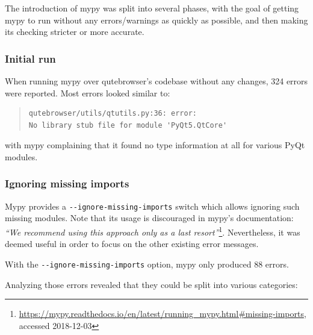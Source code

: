\documentclass[a4paper,parskip=full]{scrreprt}
\begin{document}
The introduction of mypy was split into several phases, with the goal of getting
mypy to run without any errors/warnings as quickly as possible, and then making
its checking stricter or more accurate.

\subsubsection{Initial run}
When running mypy over qutebrowser's codebase without any changes, 324 errors
were reported. Most errors looked similar to:

\begin{quote}
\begin{verbatim}
qutebrowser/utils/qtutils.py:36: error:
No library stub file for module 'PyQt5.QtCore'
\end{verbatim}
\end{quote}

with mypy complaining that it found no type information at all for various PyQt
modules.

\subsubsection{Ignoring missing imports}

Mypy provides a \verb|--ignore-missing-imports| switch which allows ignoring
such missing modules. Note that its usage is discouraged in mypy's documentation:
\emph{``We recommend using this approach only as a last resort''}\footnote{\url{https://mypy.readthedocs.io/en/latest/running_mypy.html\#missing-imports},
accessed 2018-12-03}. Nevertheless, it was deemed useful in order to focus on
the other existing error messages.

With the \verb|--ignore-missing-imports| option, mypy only produced 88 errors.

Analyzing those errors revealed that they could be split into various
categories:
\end{document}
